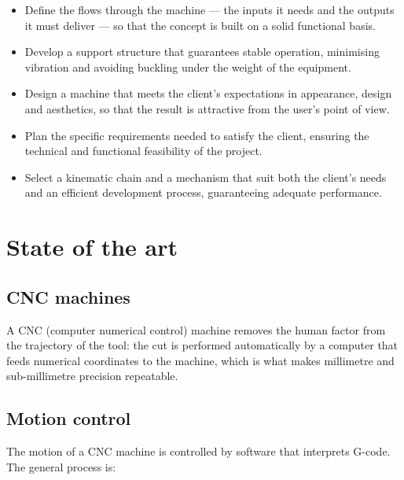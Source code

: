 \documentclass[11pt]{article}
\begin{document}
\begin{itemize}[leftmargin=*]
  \item Define the flows through the machine --- the inputs it needs and the outputs it
        must deliver --- so that the concept is built on a solid functional basis.
  \item Develop a support structure that guarantees stable operation, minimising
        vibration and avoiding buckling under the weight of the equipment.
  \item Design a machine that meets the client's expectations in appearance, design and
        aesthetics, so that the result is attractive from the user's point of view.
  \item Plan the specific requirements needed to satisfy the client, ensuring the
        technical and functional feasibility of the project.
  \item Select a kinematic chain and a mechanism that suit both the client's needs and an
        efficient development process, guaranteeing adequate performance.
\end{itemize}

\section{State of the art}

\subsection{CNC machines}

A CNC (computer numerical control) machine removes the human factor from the trajectory of
the tool: the cut is performed automatically by a computer that feeds numerical
coordinates to the machine, which is what makes millimetre and sub-millimetre precision
repeatable.

\subsection{Motion control}

The motion of a CNC machine is controlled by software that interprets G-code. The general
process is:
\end{document}
